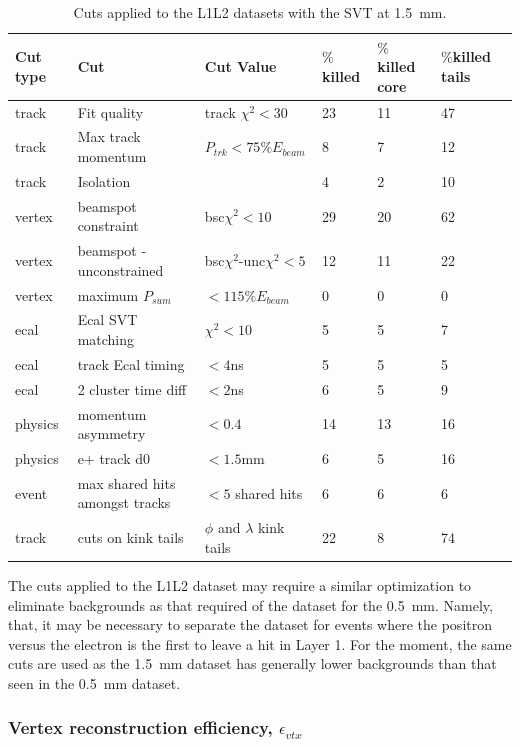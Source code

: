 \documentclass[twoside]{article}
\begin{document}
\begin{table}[H]
\caption{Cuts applied to the L1L2 datasets with the SVT at 1.5~mm.}
\label{l1l2_cuts_1p5}
\centering
\begin{tabular}{lllllll}
\toprule
Cut type & Cut & Cut Value &  $\%$killed &  $\%$killed core & $\%$killed tails\\
\midrule
track & Fit quality & track $\chi^{2}<30$ & 23 & 11 & 47 \\
track & Max track momentum &  $P_{trk}<75\%E_{beam}$ & 8 & 7 & 12 \\
track & Isolation &   & 4 & 2 & 10 \\
vertex & beamspot constraint & bsc$\chi^{2}<10$  & 29 & 20 & 62 \\
vertex & beamspot - unconstrained & bsc$\chi^{2}$-unc$\chi^2<5$  & 12 & 11 & 22 \\
vertex & maximum $P_{sum}$ &  $<115\%E_{beam}$ & 0 & 0 & 0 \\
ecal & Ecal SVT matching & $\chi^2<10$  & 5 & 5 & 7 \\
ecal & track Ecal timing & $<4$ns  & 5 & 5 & 5 \\
ecal & 2 cluster time diff & $<2$ns  & 6 & 5 & 9 \\
physics & momentum asymmetry & $<0.4$  & 14 & 13 & 16 \\
physics & e+ track d0 & $<1.5$mm  & 6 & 5 & 16 \\
event & max shared hits amongst tracks & $<5$ shared hits  & 6 & 6 & 6 \\
track & cuts on kink tails & $\phi$ and $\lambda$ kink tails & 22 & 8 & 74 \\
\bottomrule
\end{tabular}
\end{table}

The cuts applied to the L1L2 dataset may require a similar optimization to eliminate backgrounds as that required of the dataset for the 0.5~mm. Namely, that, it may be necessary to separate the dataset for events where the positron versus the electron is the first to leave a hit in Layer 1. For the moment, the same cuts are used as the 1.5~mm dataset has generally lower backgrounds than that seen in the 0.5~mm dataset.

\subsubsection{Vertex reconstruction efficiency, $\epsilon_{vtx}$}
\end{document}
